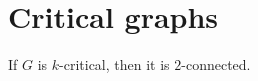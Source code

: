 \chapter{Critical graphs}

\begin{exerc}
	If $G$ is $k$-critical, then it is $2$-connected.
\end{exerc}